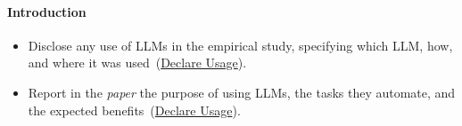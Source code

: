\documentclass[smallextended]{svjour3}
\newcommand{\must}{\textbf{must}\xspace}
\newcommand{\should}{\textbf{should}\xspace}
\newcommand{\paper}{\emph{paper}\xspace}
\newcommand{\paper}{\emph{paper}\xspace}
\newcommand{\iconM}{\usebox{\iconMbox}\xspace}
\newcommand{\iconS}{\usebox{\iconSbox}\xspace}
\newcommand{\iconM}{●\xspace}
\newcommand{\iconS}{○\xspace}
\newcommand{\refdeclareusage}{\hyperref[sec:declare-llm-usage-and-role]{Declare Usage}}
\newcommand{\refdeclareusage}{\href{/guidelines/declare-llm-usage-and-role/}{Declare Usage}}
\begin{document}
\begin{appendices}
\paragraph{\textbf{Introduction}}
\begin{itemize}[label={},leftmargin=*]
    \item \iconM Disclose any use of LLMs in the empirical study, specifying which LLM, how, and where it was used~(\refdeclareusage).
    \item \iconS Report in the \paper the purpose of using LLMs, the tasks they automate, and the expected benefits~(\refdeclareusage).
\end{itemize}


\end{appendices}
\end{document}
